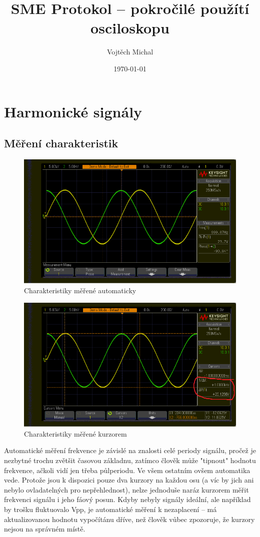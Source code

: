 \documentclass[twoside]{article}
\title{SME Protokol -- pokročilé použítí osciloskopu}
\author{Vojtěch Michal}
\date{\today}
\begin{document}
\maketitle

\section{Harmonické signály}

\subsection{Měření charakteristik}
\begin{figure}[htbp]
	\centering
	\includegraphics[width=.6\linewidth]{sinus_frek_pp_automatika.png}
\caption{Charakteristiky měřené automaticky}
\end{figure}

\begin{figure}[htbp]
	\centering
	\includegraphics[width=.6\linewidth]{sinus_frek_pp_kurzor.png              }
	\caption{Charakteristiky měřené kurzorem}
\end{figure}

Automatické měření frekvence je závislé na znalosti celé periody signálu, pročež je nezbytné trochu zvětšit časovou základnu,
zatímco člověk může "tipnout" hodnotu frekvence, ačkoli vidí jen třeba půlperiodu. Ve všem ostatním ovšem automatika vede.
Protože jsou k dispozici pouze dva kurzory na každou osu (a víc by jich ani nebylo ovladatelných pro nepřehlednost),
nelze jednoduše naráz kurzorem měřit frekvenci signálu i jeho fáový posun.
Kdyby nebyly signály ideální, ale například by trošku fluktuovalo Vpp, je automatické měření k nezaplacení -- má aktualizovanou 
hodnotu vypočítánu dříve, než člověk vůbec zpozoruje, že kurzory nejsou na správném místě.
\end{document}
